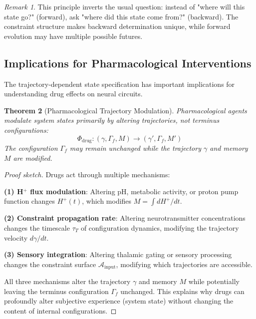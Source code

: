 \documentclass[aps,prd,twocolumn,superscriptaddress,floatfix,nofootinbib]{revtex4-2}
\newtheorem{theorem}{Theorem}[section]
\theoremstyle{remark}
\newtheorem{remark}[theorem]{Remark}
\begin{document}
\begin{remark}
This principle inverts the usual question: instead of "where will this state go?" (forward), ask "where did this state come from?" (backward). The constraint structure makes backward determination unique, while forward evolution may have multiple possible futures.
\end{remark}

\subsection{Implications for Pharmacological Interventions}

The trajectory-dependent state specification has important implications for understanding drug effects on neural circuits.

\begin{theorem}[Pharmacological Trajectory Modulation]
\label{thm:drug_trajectory}
Pharmacological agents modulate system states primarily by altering trajectories, not terminus configurations:
\begin{equation}
\Phi_{\text{drug}}: (\gamma, \Gamma_f, M) \to (\gamma', \Gamma_f, M')
\end{equation}
The configuration $\Gamma_f$ may remain unchanged while the trajectory $\gamma$ and memory $M$ are modified.
\end{theorem}

\begin{proof}[Proof sketch]
Drugs act through multiple mechanisms:

\textbf{(1) H$^+$ flux modulation}: Altering pH, metabolic activity, or proton pump function changes $H^+(t)$, which modifies $M = \int dH^+/dt$.

\textbf{(2) Constraint propagation rate}: Altering neurotransmitter concentrations changes the timescale $\tau_T$ of configuration dynamics, modifying the trajectory velocity $d\gamma/dt$.

\textbf{(3) Sensory integration}: Altering thalamic gating or sensory processing changes the constraint surface $\mathcal{A}_{\text{input}}$, modifying which trajectories are accessible.

All three mechanisms alter the trajectory $\gamma$ and memory $M$ while potentially leaving the terminus configuration $\Gamma_f$ unchanged. This explains why drugs can profoundly alter subjective experience (system state) without changing the content of internal configurations.
\end{proof}
\end{document}
